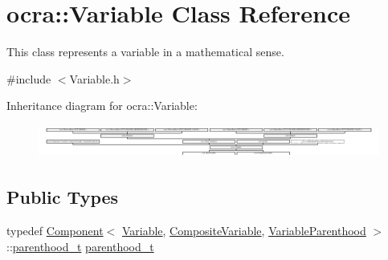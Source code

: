 \hypertarget{classocra_1_1Variable}{}\section{ocra\+:\+:Variable Class Reference}
\label{classocra_1_1Variable}


This class represents a variable in a mathematical sense.  




{\ttfamily \#include $<$Variable.\+h$>$}

Inheritance diagram for ocra\+:\+:Variable\+:\begin{figure}[H]
\begin{center}
\leavevmode
\includegraphics[height=1.100629cm]{d2/dac/classocra_1_1Variable}
\end{center}
\end{figure}
\subsection*{Public Types}
\begin{DoxyCompactItemize}
\item 
typedef \hyperlink{classocra_1_1Component}{Component}$<$ \hyperlink{classocra_1_1Variable}{Variable}, \hyperlink{classocra_1_1CompositeVariable}{Composite\+Variable}, \hyperlink{structocra_1_1VariableParenthood}{Variable\+Parenthood} $>$\+::\hyperlink{classocra_1_1Variable_a88444b2124cf5aab069f46734822f31f}{parenthood\+\_\+t} \hyperlink{classocra_1_1Variable_a88444b2124cf5aab069f46734822f31f}{parenthood\+\_\+t}
\end{DoxyCompactItemize}
